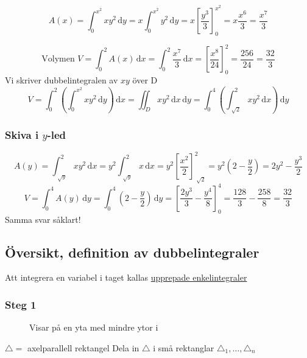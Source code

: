 \documentclass[a4paper]{article}
\let\oldsqrt\sqrt
\renewcommand*{\sqrt}[2][\ ]{\oldsqrt[#1]{#2} }
\begin{document}
$$
	A(x) = \int_0^{x^2}xy^2 \,\mathrm{d}y = x \int_0^{x^2} y^2 \,\mathrm{d}y = x\left[\frac{y^3}{3}\right]^{x^2}_0 = x \frac{x^6}{3} = \frac{x^7}{3}
$$

$$
	\text{Volymen }V = \int_0^2 A(x)\,\mathrm{d}x = \int_0^2 \frac{x^7}{3} \,\mathrm{d}x = \left[\frac{x^8}{24}\right]_0^2 = \frac{256}{24} = \frac{32}{3}
$$
Vi skriver dubbelintegralen av $xy$ över D
$$
	V = \int_0^2\left(\int_0^{x^2} xy^2 \,\mathrm{d}y \right)\,\mathrm{d}x = \iint_D xy^2 \,\mathrm{d}x\,\mathrm{d}y = \int_0^4 \left( \int_{\sqrt{2}}^2 xy^2 \,\mathrm{d}x \right) \,\mathrm{d}y
$$

\subsubsection{Skiva i \texorpdfstring{$y$}{y}-led}

$$
	A(y) = \int_{\sqrt{y}}^2 xy^2 \,\mathrm{d}x = y^2 \int_{\sqrt{y}}^2 x \,\mathrm{d}x = y^2 \left[\frac{x^2}{2}\right]_{\sqrt{2}}^2 = y^2\left(2- \frac{y}{2}\right) = 2y^2 - \frac{y^3}{2}
$$
$$
	V = \int_0^4 A(y) \,\mathrm{d}y = \int_0^4 \left(2- \frac{y}{2}\right)\,\mathrm{d}y = \left[\frac{2y^3}{3} - \frac{y^4}{8}\right]_0^4 = \frac{128}{3} - \frac{258}{8} = \frac{32}{3}
$$
Samma svar såklart!

\newpage
\subsection{Översikt, definition av dubbelintegraler}
Att integrera en variabel i taget kallas \underline{upprepade enkelintegraler}
\subsubsection{Steg 1}

\begin{figure}[ht]
  \caption{Visar på en yta med mindre ytor i} \label{fig:9.3}
\end{figure}

$\triangle =$ axelparallell rektangel \newline
Dela in $\triangle$ i små rektanglar $\triangle_1,\ldots,\triangle_n$ \newline
\end{document}
